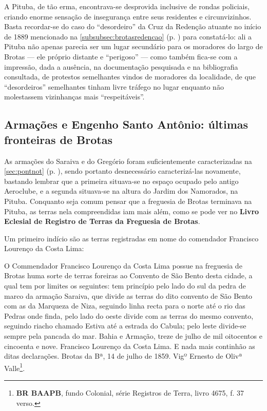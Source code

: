 A Pituba, de tão erma, encontrava-se desprovida inclusive de rondas policiais, criando enorme sensação de insegurança entre seus residentes e circunvizinhos. Basta recordar-se do caso do ``desordeiro'' da Cruz da Redenção atuante no início de 1889 mencionado na \autoref{subsubsec:brotasredencao} (p. \pageref{subsubsec:brotasredencao}) para constatá-lo: ali a Pituba não apenas parecia ser um lugar secundário para os moradores do largo de Brotas --- ele próprio distante e ``perigoso'' --- como também fica-se com a impressão, dada a ausência, na documentação pesquisada e na bibliografia consultada, de protestos semelhantes vindos de moradores da localidade, de que ``desordeiros'' semelhantes tinham livre tráfego no lugar enquanto não molestassem vizinhanças mais ``respeitáveis''.

\subsection{Armações e Engenho Santo Antônio: últimas fronteiras de Brotas}

As armações do Saraiva e do Gregório foram suficientemente caracterizadas na \autoref{sec:pontnot} (p. \pageref{sec:pontnot}), sendo portanto desnecessário caracterizá-las novamente, bastando lembrar que a primeira situava-se no espaço ocupado pelo antigo Aeroclube, e a segunda situava-se na altura do Jardim dos Namorados, na Pituba. Conquanto seja comum pensar que a freguesia de Brotas terminava na Pituba, as terras nela compreendidas iam mais além, como se pode ver no \textbf{Livro Eclesial de Registro de Terras da Freguesia de Brotas}. 

Um primeiro indício são as terras registradas em nome do comendador Francisco Lourenço da Costa Lima:

\begin{citacao}
O Commendador Francisco Lourenço da Costa Lima possue na freguesia de Brotas huma sorte de terras foreiras ao Convento de São Bento desta cidade, a qual tem por limites os seguintes: tem princípio pelo lado do sul da pedra de marco da armação Saraiva, que divide as terras do dito convento de São Bento com as da Marqueza de Niza, seguindo linha recta para o norte até o rio das Pedras onde finda, pelo lado do oeste divide com as terras do mesmo convento, seguindo riacho chamado Estiva até a estrada do Cabula; pelo leste divide-se sempre pela pancada do mar. Bahia e Armação, treze de julho de mil oitocentos e cincoenta e nove. Francisco Lourenço da Costa Lima. E nada mais continhão as ditas declarações. Brotas da Bª, 14 de julho de 1859. Vigº Ernesto de Olivª Valle\footnote{\textbf{BR BAAPB}, fundo Colonial, série Registros de Terra, livro 4675, f. 37 verso.}.
\end{citacao}

